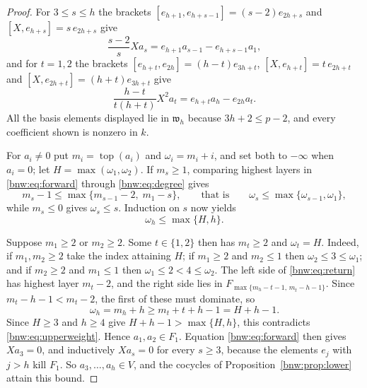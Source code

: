 \documentclass[11pt,reqno]{amsart}
\theoremstyle{definition}
\theoremstyle{remark}
\theoremstyle{definition}
\begin{document}
\begin{proof}
For $3\le s\le h$ the brackets
$[e_{h+1},e_{h+s-1}]=(s-2)e_{2h+s}$ and $[X,e_{h+s}]=s\,e_{2h+s}$
give
\begin{equation}\label{bnw:eq:forward}
\frac{s-2}{s}Xa_s=e_{h+1}a_{s-1}-e_{h+s-1}a_1,
\end{equation}
and for $t=1,2$ the brackets $[e_{h+t},e_{2h}]=(h-t)e_{3h+t}$,
$[X,e_{h+t}]=t\,e_{2h+t}$ and $[X,e_{2h+t}]=(h+t)e_{3h+t}$ give
\begin{equation}\label{bnw:eq:return}
\frac{h-t}{t(h+t)}X^2a_t=e_{h+t}a_h-e_{2h}a_t.
\end{equation}
All the basis elements displayed lie in $\mathfrak{w}_h$ because
$3h+2\le p-2$, and every coefficient shown is nonzero in $k$.

For $a_i\ne0$ put $m_i=\operatorname{top}(a_i)$ and $\omega_i=m_i+i$, and set both to
$-\infty$ when $a_i=0$; let $H=\max(\omega_1,\omega_2)$. If $m_s\ge1$, comparing
highest layers in \eqref{bnw:eq:forward} through \eqref{bnw:eq:degree} gives
\[
m_s-1\le\max\{m_{s-1}-2,\;m_1-s\},
\qquad\text{that is}\qquad
\omega_s\le\max\{\omega_{s-1},\omega_1\},
\]
while $m_s\le0$ gives $\omega_s\le s$.
Induction on $s$ now yields
\begin{equation}\label{bnw:eq:upperweight}
\omega_h\le\max\{H,h\}.
\end{equation}

Suppose $m_1\ge2$ or $m_2\ge2$. Some $t\in\{1,2\}$ then has
$m_t\ge2$ and $\omega_t=H$. Indeed, if $m_1,m_2\ge2$ take the index
attaining $H$; if $m_1\ge2$ and $m_2\le1$ then $\omega_2\le3\le \omega_1$; and
if $m_2\ge2$ and $m_1\le1$ then $\omega_1\le2<4\le \omega_2$. The left side
of \eqref{bnw:eq:return} has highest layer $m_t-2$, and the right side
lies in $F_{\max\{m_h-t-1,\,m_t-h-1\}}$. Since $m_t-h-1<m_t-2$, the
first of these must dominate, so
\[
\omega_h=m_h+h\ge m_t+t+h-1=H+h-1.
\]
Since $H\ge3$ and $h\ge4$ give $H+h-1>\max\{H,h\}$, this contradicts
\eqref{bnw:eq:upperweight}. Hence $a_1,a_2\in F_1$. Equation
\eqref{bnw:eq:forward} then gives $Xa_3=0$, and inductively $Xa_s=0$ for
every $s\ge3$, because the elements $e_j$ with $j>h$ kill $F_1$.
So $a_3,\ldots,a_h\in V$, and the cocycles of
Proposition~\ref{bnw:prop:lower} attain this bound.
\end{proof}
\end{document}
